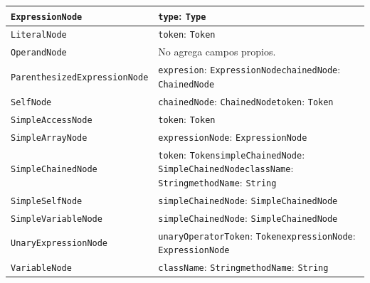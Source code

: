 \begin{longtable}{|>{\raggedright\arraybackslash}p{}|>{\raggedright\arraybackslash}p{}|}
\texttt{Expression\allowbreak Node} & \texttt{type}: \texttt{Type} \\ \hline
\texttt{Literal\allowbreak Node} & \texttt{token}: \texttt{Token} \\ \hline
\texttt{Operand\allowbreak Node} & No agrega campos propios. \\ \hline
\texttt{Parenthesized\allowbreak Expression\allowbreak Node} & \texttt{expresion}: \texttt{Expression\allowbreak Node}\newline \texttt{chained\allowbreak Node}: \texttt{Chained\allowbreak Node} \\ \hline
\texttt{Self\allowbreak Node} & \texttt{chained\allowbreak Node}: \texttt{Chained\allowbreak Node}\newline \texttt{token}: \texttt{Token} \\ \hline
\texttt{Simple\allowbreak Access\allowbreak Node} & \texttt{token}: \texttt{Token} \\ \hline
\texttt{Simple\allowbreak Array\allowbreak Node} & \texttt{expression\allowbreak Node}: \texttt{Expression\allowbreak Node} \\ \hline
\texttt{Simple\allowbreak Chained\allowbreak Node} & \texttt{token}: \texttt{Token}\newline \texttt{simple\allowbreak Chained\allowbreak Node}: \texttt{Simple\allowbreak Chained\allowbreak Node}\newline \texttt{class\allowbreak Name}: \texttt{String}\newline \texttt{method\allowbreak Name}: \texttt{String} \\ \hline
\texttt{Simple\allowbreak Self\allowbreak Node} & \texttt{simple\allowbreak Chained\allowbreak Node}: \texttt{Simple\allowbreak Chained\allowbreak Node} \\ \hline
\texttt{Simple\allowbreak Variable\allowbreak Node} & \texttt{simple\allowbreak Chained\allowbreak Node}: \texttt{Simple\allowbreak Chained\allowbreak Node} \\ \hline
\texttt{Unary\allowbreak Expression\allowbreak Node} & \texttt{unary\allowbreak Operator\allowbreak Token}: \texttt{Token}\newline \texttt{expression\allowbreak Node}: \texttt{Expression\allowbreak Node} \\ \hline
\texttt{Variable\allowbreak Node} & \texttt{class\allowbreak Name}: \texttt{String}\newline \texttt{method\allowbreak Name}: \texttt{String} \\ \hline
\end{longtable}
\endgroup
